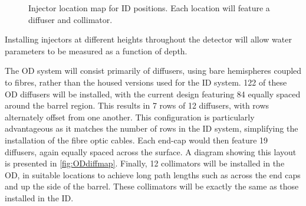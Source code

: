 \documentclass[a4paper,11pt]{article}
\begin{document}
\begin{figure}[h]
\caption{Injector location map for ID positions. Each location will feature a diffuser and collimator.}\label{fig:IDmap}
\end{figure}
Installing injectors at different heights throughout the detector will allow water parameters to be measured as a function of depth.

The OD system will consist primarily of diffusers, using bare hemispheres coupled to fibres, rather than the housed versions used for the ID system. 122 of these OD diffusers will be installed, with the current design featuring 84 equally spaced around the barrel region. This results in 7 rows of 12 diffusers, with rows alternately offset from one another. This configuration is particularly advantageous as it matches the number of rows in the ID system, simplifying the installation of the fibre optic cables. Each end-cap would then feature 19 diffusers, again equally spaced across the surface. A diagram showing this layout is presented in \cref{fig:ODdiffmap}. Finally, 12 collimators will be installed in the OD, in suitable locations to achieve long path lengths such as across the end caps and up the side of the barrel. These collimators will be exactly the same as those installed in the ID.
\end{document}

